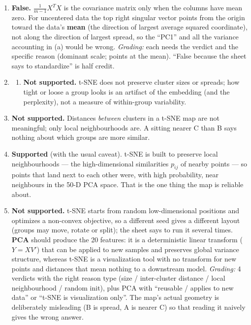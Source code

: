 \documentclass[
  11pt,
]{article}
\providecommand{\tightlist}{%
  \setlength{\itemsep}{0pt}\setlength{\parskip}{0pt}}
\begin{document}
\begin{solutionbox}
\begin{enumerate}
\def\labelenumi{(\roman{enumi})}
\setcounter{enumi}{1}
\item
  \textbf{False.} \(\frac{1}{m-1}X^TX\) is the covariance matrix only
  when the columns have mean zero. For uncentered data the top right
  singular vector points from the origin toward the data's \textbf{mean}
  (the direction of largest average squared coordinate), not along the
  direction of largest spread, so the ``PC1'' and all the variance
  accounting in (a) would be wrong. \emph{Grading:} each needs the
  verdict and the specific reason (dominant scale; points at the mean).
  ``False because the sheet says to standardize'' is half credit.
\item
  \begin{enumerate}
  \def\labelenumii{(\roman{enumii})}
  \tightlist
  \item
    \textbf{Not supported.} t-SNE does not preserve cluster sizes or
    spreads; how tight or loose a group looks is an artifact of the
    embedding (and the perplexity), not a measure of within-group
    variability.
  \end{enumerate}
\item
  \textbf{Not supported.} Distances \emph{between} clusters in a t-SNE
  map are not meaningful; only local neighbourhoods are. A sitting
  nearer C than B says nothing about which groups are more similar.
\item
  \textbf{Supported} (with the usual caveat). t-SNE is built to preserve
  local neighbourhoods --- the high-dimensional similarities \(p_{ij}\)
  of nearby points --- so points that land next to each other were, with
  high probability, near neighbours in the 50-D PCA space. That is the
  one thing the map is reliable about.
\item
  \textbf{Not supported.} t-SNE starts from random low-dimensional
  positions and optimizes a non-convex objective, so a different seed
  gives a different layout (groups may move, rotate or split); the sheet
  says to run it several times. \textbf{PCA} should produce the 20
  features: it is a deterministic linear transform (\(Y = XV'\)) that
  can be applied to new samples and preserves global variance structure,
  whereas t-SNE is a visualization tool with no transform for new points
  and distances that mean nothing to a downstream model. \emph{Grading:}
  4 verdicts with the right reason type (size / inter-cluster distance /
  local neighbourhood / random init), plus PCA with ``reusable / applies
  to new data'' or ``t-SNE is visualization only''. The map's actual
  geometry is deliberately misleading (B is spread, A is nearer C) so
  that reading it naively gives the wrong answer.
\end{enumerate}

\end{solutionbox}
\end{document}
